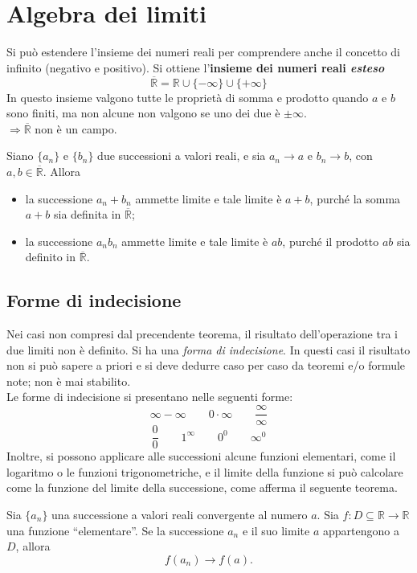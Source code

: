 \documentclass[a4paper,12pt, oneside]{book}
\begin{document}
\section{Algebra dei limiti}
\begin{shaded}
	Si può estendere l'insieme dei numeri reali per comprendere anche il concetto di infinito (negativo e positivo). Si ottiene l'\textbf{insieme dei numeri reali \emph{esteso}} $$\overline{\mathbb{R}}=\mathbb{R}\cup\{-\infty\}\cup\{+\infty\}$$In questo insieme valgono tutte le proprietà di somma e prodotto quando $a$ e $b$ sono finiti, ma non alcune non valgono se uno dei due è $\pm\infty$.\\$\Rightarrow\overline{\mathbb{R}}$ non è un campo.
\end{shaded}
\begin{teorema}
	Siano $\{a_n\}$ e $\{b_n\}$ due successioni a valori reali, e sia $a_n\to a$ e $b_n\to b$, con $a,b\in\overline{\mathbb{R}}$. Allora
	\begin{itemize}
		\item la successione $a_n+b_n$ ammette limite e tale limite è $a+b$, purché la somma $a+b$ sia definita in $\overline{\mathbb{R}}$;
		\item la successione $a_nb_n$ ammette limite e tale limite è $ab$, purché il prodotto $ab$ sia definito in $\overline{\mathbb{R}}$.
	\end{itemize}
\end{teorema}
\subsection{Forme di indecisione}
Nei casi non compresi dal precendente teorema, il risultato dell'operazione tra i due limiti non è definito. Si ha una \textit{forma di indecisione}. In questi casi il risultato non si può sapere a priori e si deve dedurre caso per caso da teoremi e/o formule note; non è mai stabilito.\\
Le forme di indecisione si presentano nelle seguenti forme:
$$\infty-\infty\qquad 0\cdot\infty\qquad\frac{\infty}{\infty}$$
$$\frac00\qquad 1^\infty\qquad 0^0\qquad \infty^0$$
Inoltre, si possono applicare alle successioni alcune funzioni elementari, come il logaritmo o le funzioni trigonometriche, e il limite della funzione si può calcolare come la funzione del limite della successione, come afferma il seguente teorema.
\begin{teorema}
	Sia $\{a_n\}$ una successione a valori reali convergente al numero $a$. Sia $f\colon D\subseteq\mathbb{R}\to\mathbb{R}$ una funzione ``elementare''. Se la successione $a_n$ e il suo limite $a$ appartengono a $D$, allora
	\[
		f(a_n)\to f(a).
	\]
\end{teorema}
\end{document}
